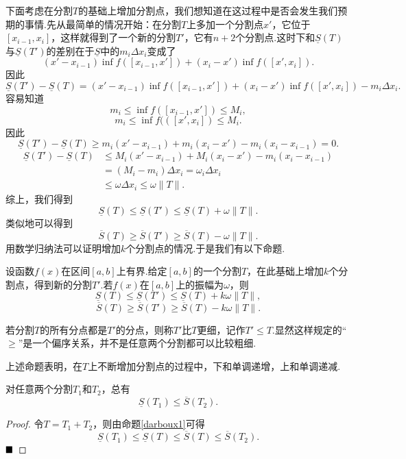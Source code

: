 下面考虑在分割$T$的基础上增加分割点，我们想知道在这过程中是否会发生我们预期的事情.先从最简单的情况开始：在分割$T$上多加一个分割点$x'$，它位于$\left[x_{i-1},x_i\right]$，这样就得到了一个新的分割$T'$，它有$n+2$个分割点.这时下和$\underline{S}(T)$与$\underline{S}(T')$的差别在于$\underline{S}$中的$m_i\Delta x_i$变成了
$$(x'-x_{i-1})\inf f(\left[x_{i-1},x'\right])+(x_i-x')\inf f(\left[x',x_i\right]).$$
因此
$$\underline{S}(T')-\underline{S}(T)=(x'-x_{i-1})\inf f(\left[x_{i-1},x'\right])+(x_i-x')\inf f(\left[x',x_i\right])-m_i\Delta x_i.$$
容易知道
$$m_i\leqslant\inf f(\left[x_{i-1},x'\right])\leqslant M_i,$$
$$m_i\leqslant\inf f((\left[x',x_i\right])\leqslant M_i.$$
因此
$$\underline{S}(T')-\underline{S}(T)\geqslant m_i(x'-x_{i-1})+m_i(x_i-x')-m_i(x_i-x_{i-1})=0.$$
\begin{align*}
	\underline{S}(T')-\underline{S}(T)&\leqslant M_i(x'-x_{i-1})+M_i(x_i-x')-m_i(x_i-x_{i-1})\\
	&=(M_i-m_i)\Delta x_i=\omega_i\Delta x_i\\
	&\leqslant\omega\Delta x_i\leqslant\omega\|T\|.
\end{align*}
综上，我们得到
$$\underline{S}(T)\leqslant\underline{S}(T')\leqslant\underline{S}(T)+\omega\|T\|.$$
类似地可以得到
$$\overline{S}(T)\geqslant\overline{S}(T')\geqslant\overline{S}(T)-\omega\|T\|.$$
用数学归纳法可以证明增加$k$个分割点的情况.于是我们有以下命题.
\begin{proposition}{\label{darboux1}}
	设函数$f(x)$在区间$\left[a,b\right]$上有界.给定$\left[a,b\right]$的一个分割$T$，在此基础上增加$k$个分割点，得到新的分割$T'$.若$f(x)$在$\left[a,b\right]$上的振幅为$\omega$，则
	$$\underline{S}(T)\leqslant\underline{S}(T')\leqslant\underline{S}(T)+k\omega\|T\|,$$
	$$\overline{S}(T)\geqslant\overline{S}(T')\geqslant\overline{S}(T)-k\omega\|T\|.$$
\end{proposition}
\begin{remark}
	若分割$T$的所有分点都是$T'$的分点，则称$T'$比$T$更细，记作$T'\leqslant T$.显然这样规定的“$\geqslant$”是一个偏序关系，并不是任意两个分割都可以比较粗细.
\end{remark}
\begin{remark}
	上述命题表明，在$T$上不断增加分割点的过程中，下和单调递增，上和单调递减.
\end{remark}
\begin{proposition}
	对任意两个分割$T_1$和$T_2$，总有
	$$\underline{S}(T_1)\leqslant\overline{S}(T_2).$$
\end{proposition}
\begin{proof}
	令$T=T_1+T_2$，则由命题\ref{darboux1}可得
	$$\underline{S}(T_1)\leqslant\underline{S}(T)\leqslant\overline{S}(T)\leqslant\overline{S}(T_2).$$
	$\hfill\blacksquare$
\end{proof}

